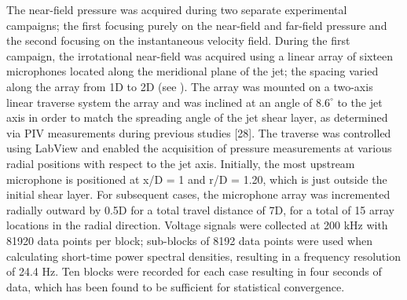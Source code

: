 The near-field pressure was acquired  during two separate experimental campaigns; the first focusing purely on the near-field and far-field pressure and the second focusing on the instantaneous velocity field. During the first campaign, the irrotational near-field was acquired using a linear array of sixteen microphones located along the meridional plane of the jet; the spacing varied along the array from 1D to 2D (see ). 
The array was mounted on a two-axis linear traverse system the array and was inclined at an angle of $8.6^\circ$ to the jet axis in order to match the spreading angle of the jet shear layer, as determined via PIV measurements during previous studies [28]. 
The traverse was controlled using LabView and enabled the acquisition of pressure measurements at various radial positions with respect to the jet axis. 
Initially, the most upstream microphone is positioned at x/D = 1 and r/D = 1.20, which is just outside the initial shear layer.
For subsequent cases, the microphone array was incremented radially outward by 0.5D for a total travel distance of 7D, for a total of 15 array locations in the radial direction.
Voltage signals were collected at 200 kHz with 81920 data points per block; sub-blocks of 8192 data points were used when calculating short-time power spectral densities, resulting in a frequency resolution of 24.4 Hz. 
Ten blocks were recorded for each case resulting in four seconds of data, which has been found to be sufficient for statistical convergence.
